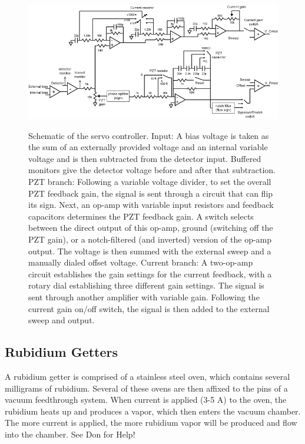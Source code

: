 \documentclass{../lab}
\begin{document}
\begin{figure}[h]
    \centering
    \href{http://experimentationlab.berkeley.edu/sites/default/files/images/Electronics_schematic_v2.png}{\includegraphics[width=0.5\linewidth]{images/Electronics_schematic_v2.png}}
    \caption{Schematic of the servo controller. Input: A bias voltage is taken as the sum of an externally provided voltage and an internal variable voltage and is then subtracted from the detector input. Buffered monitors give the detector voltage before and after that subtraction. PZT branch: Following a variable voltage divider, to set the overall PZT feedback gain, the signal is sent through a circuit that can flip its sign. Next, an op-amp with variable input resistors and feedback capacitors determines the PZT feedback gain. A switch selects between the direct output of this op-amp, ground (switching off the PZT gain), or a notch-filtered (and inverted) version of the op-amp output. The voltage is then summed with the external sweep and a manually dialed offset voltage. Current branch: A two-op-amp circuit establishes the gain settings for the current feedback, with a rotary dial establishing three different gain settings. The signal is sent through another amplifier with variable gain. Following the current gain on/off switch, the signal is then added to the external sweep and output.}
    \label{fig:SchematicOfServoController}
\end{figure}

\subsection{Rubidium Getters}

A rubidium getter is comprised of a stainless steel oven, which contains several milligrams of rubidium. Several of these ovens are then affixed to the pins of a vacuum feedthrough system. When current is applied (3-5 A) to the oven, the rubidium heats up and produces a vapor, which then enters the vacuum chamber. The more current is applied, the more rubidium vapor will be produced and flow into the chamber. See Don for Help!
\end{document}
